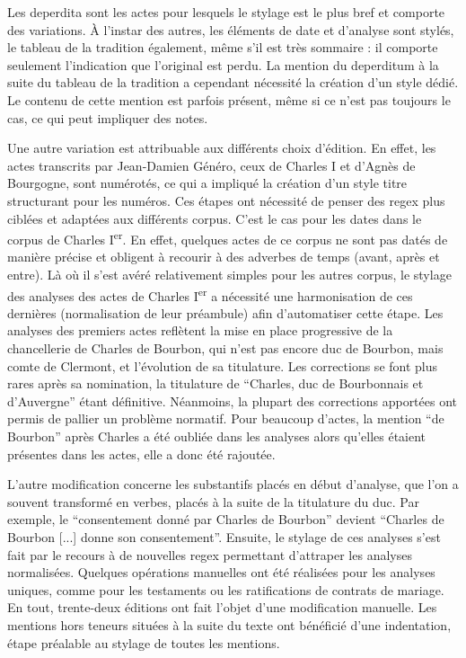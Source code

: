 \par Les deperdita sont les actes pour lesquels le stylage est le plus bref et comporte des variations. À l'instar des autres, les éléments de date et d'analyse sont stylés, le tableau de la tradition également, même s'il est très sommaire : il comporte seulement l'indication que l'original est perdu. La mention du deperditum à la suite du tableau de la tradition a cependant nécessité la création d'un style dédié. Le contenu de cette mention est parfois présent, même si ce n'est pas toujours le cas, ce qui peut impliquer des notes. 
\newline 

\par Une autre variation est attribuable aux différents choix d'édition. En effet, les actes transcrits par Jean-Damien Généro, ceux de Charles I et d'Agnès de Bourgogne, sont numérotés, ce qui a impliqué la création d'un style titre structurant pour les numéros. Ces étapes ont nécessité de penser des regex plus ciblées et adaptées aux différents corpus. C’est le cas pour les dates dans le corpus de Charles I\textsuperscript{er}. En effet, quelques actes de ce corpus ne sont pas datés de manière précise et obligent à recourir à des adverbes de temps (avant, après et entre). Là où il s'est avéré relativement simples pour les autres corpus, le stylage des analyses des actes de Charles I\textsuperscript{er} a nécessité une harmonisation de ces dernières (normalisation de leur préambule) afin d'automatiser cette étape. Les analyses des premiers actes reflètent la mise en place progressive de la chancellerie de Charles de Bourbon, qui n'est pas encore duc de Bourbon, mais comte de Clermont, et l'évolution de sa titulature. Les corrections se font plus rares après sa nomination, la titulature de “Charles, duc de Bourbonnais et d’Auvergne” étant définitive. Néanmoins, la plupart des corrections apportées ont permis de pallier un problème normatif. Pour beaucoup d’actes, la mention “de Bourbon” après Charles a été oubliée dans les analyses alors qu’elles étaient présentes dans les actes, elle a donc été rajoutée. 
\newpage 

\par L’autre modification concerne les substantifs placés en début d’analyse, que l'on a souvent transformé en verbes, placés à la suite de la titulature du duc. Par exemple, le “consentement donné par Charles de Bourbon” devient “Charles de Bourbon [...] donne son consentement”. Ensuite, le stylage de ces analyses s’est fait par le recours à de nouvelles regex permettant d’attraper les analyses normalisées. Quelques opérations manuelles ont été réalisées pour les analyses uniques, comme pour les testaments ou les ratifications de contrats de mariage. En tout, trente-deux éditions ont fait l'objet d'une modification manuelle. Les mentions hors teneurs situées à la suite du texte ont bénéficié d'une indentation, étape préalable au stylage de toutes les mentions. 
\newline 

